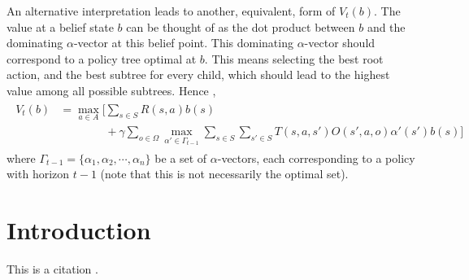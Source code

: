 \documentclass{article}
\begin{document}
An alternative interpretation leads to another, equivalent, form of $V_t(b)$. The value at a belief state $b$ can be thought of as the dot product between $b$ and the dominating $\alpha$-vector at this belief point. This dominating $\alpha$-vector should correspond to a policy tree optimal at $b$. This means selecting the best root action, and the best subtree for every child, which should lead to the highest value among all possible subtrees. Hence \cite{pineau2003point},
\begin{align}
\begin{split}
V_t(b) &= \max_{a\in A} \Bigg[ \sum_{s\in S} R(s,a)b(s)\\
&\qquad\qquad+ \gamma \sum_{o\in\Omega} \max_{\alpha'\in \Gamma_{t-1}} \sum_{s\in S} \sum_{s'\in S} T(s,a,s')O(s',a,o)\alpha'(s')b(s)  \Bigg]
\end{split}
\end{align}
where $\Gamma_{t-1}=\{\alpha_1,\alpha_2,\cdots,\alpha_n\}$ be a set of $\alpha$-vectors, each corresponding to a policy with horizon $t-1$ (note that this is not necessarily the optimal set).






\section{Introduction}
This is a citation \cite{diuk2008object}.



\end{document}
